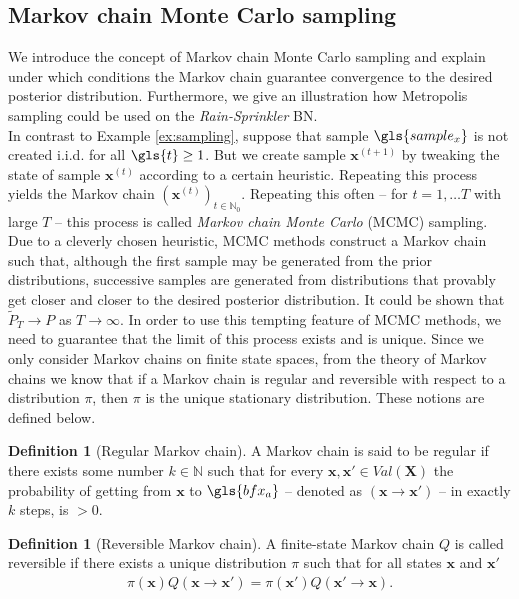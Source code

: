 \documentclass[a4paper, twoside, 11pt]{report}
\newcommand{\bfx}{{\mathbf{x}}}
\theoremstyle{plain}
\theoremstyle{definition}
\newtheorem{definition}[thm]{Definition}
\theoremstyle{remark}
\newcommand{\bfX}{{\mathbf{X}}}
\def\N{{\mathbb N}}
\begin{document}
\subsection{Markov chain Monte Carlo sampling}\label{sec:mcmc}
We introduce the concept of Markov chain Monte Carlo sampling and explain under which conditions the Markov chain guarantee convergence to the desired posterior distribution. Furthermore, we give an illustration how Metropolis sampling could be used on the \textit{Rain-Sprinkler} BN. \\

In contrast to Example \ref{ex:sampling}, suppose that sample $\gls{sample_x}$ is not created i.i.d. for all $\gls{t} \geq 1$. But we create sample $\bfx^{(t+1)}$ by tweaking the state of sample $\bfx^{(t)}$ according to a certain heuristic. Repeating this process yields the Markov chain $(\bfx^{(t)})_{t \in \N_0}$. Repeating this often -- for $t = 1, \ldots T$ with large $T$  -- this process is called \textit{Markov chain Monte Carlo} (MCMC) sampling. 
Due to a cleverly chosen heuristic, MCMC methods construct a Markov chain such that, although the first sample may be generated from the prior distributions, successive samples are generated from distributions that provably get closer and closer to the desired posterior distribution. It could be shown \citep[p.~517]{koller2009probabilistic} that $\widetilde{P}_T \to P$ as $T \to \infty$. In order to use this tempting feature of MCMC methods, we need to guarantee that the limit of this process exists and is unique. Since we only consider Markov chains on finite state spaces, from the theory of Markov chains we know that if a Markov chain is regular and reversible with respect to a distribution $\pi$, then $\pi$ is the unique stationary distribution. These notions are defined below.



\begin{definition}[Regular Markov chain]
A Markov chain is said to be regular if there exists some number $k \in \N$ such that for every $\bfx, \bfx' \in Val(\bfX)$ the probability of getting from $\bfx$ to $\gls{bfx_a}$ -- denoted as $(\bfx \to \bfx')$ -- in exactly $k$ steps, is $> 0$. 
\end{definition}

\begin{definition}[Reversible Markov chain]
A finite-state Markov chain $Q$ is called reversible if there exists a unique distribution $\pi$ such that for all states $\bfx$ and $\bfx'$
\begin{align}
\pi(\bfx) Q(\bfx \to \bfx') = \pi(\bfx') Q(\bfx' \to \bfx).
\end{align}
\end{definition}
\end{document}
